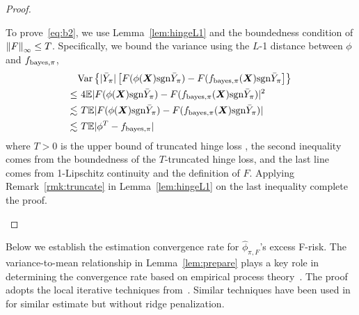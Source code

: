 \documentclass[11pt]{article}
\theoremstyle{plain}
\theoremstyle{definition}
\def\sign{\textup{sgn}}
\def\bayespif{f_{\textup{bayes},\pi}}
\def\shift{\bar Y_\pi}
\begin{document}
\begin{proof}
\begin{enumerate}[label={2.\arabic*},wide, labelwidth=!, labelindent=0pt]
To prove~\eqref{eq:b2}, we use Lemma~\ref{lem:hingeL1} and the boundedness condition of $\left\lVert F\right\rVert_\infty\leq T$. Specifically, we bound the variance using the $L$-1 distance between $\phi$ and $\bayespif$, 
\begin{align}
&\text{Var}\left\{|\shift|\left[F(\phi(\mX)\sign \shift)-F(\bayespif(\mX)\sign \shift\right]\right\}\\
\leq&\ 4 \mathbb{E}|F(\phi(\mX)\sign \shift)-F(\bayespif(\mX)\sign \shift)|^2\\
\lesssim &\ T\mathbb{E}|F(\phi(\mX)\sign \shift)-F(\bayespif(\mX)\sign \shift)|\\
\lesssim &\ T\mathbb{E}|\phi^T-\bayespif|
\end{align}
where $T>0$ is the upper bound of truncated hinge loss , the second inequality comes from the boundedness of the $T$-truncated hinge loss, and the last line comes from 1-Lipschitz continuity and the definition of $F$. Applying Remark~\ref{rmk:truncate} in Lemma~\ref{lem:hingeL1} on the last inequality complete the proof.

\end{enumerate}
\end{proof}

Below we establish the estimation convergence rate for $\hat \phi_{\pi,F}$'s excess F-risk. The variance-to-mean relationship in Lemma~\ref{lem:prepare} plays a key role in determining the convergence rate based on empirical process theory~\citep{shen1994convergence}.
The proof adopts the local iterative techniques from~\citet[Theorem 3]{wang2008probability}. Similar techniques have been used in \citet[Theorem 4]{bartlett2006convexity} for similar estimate but without ridge penalization.
\end{document}
